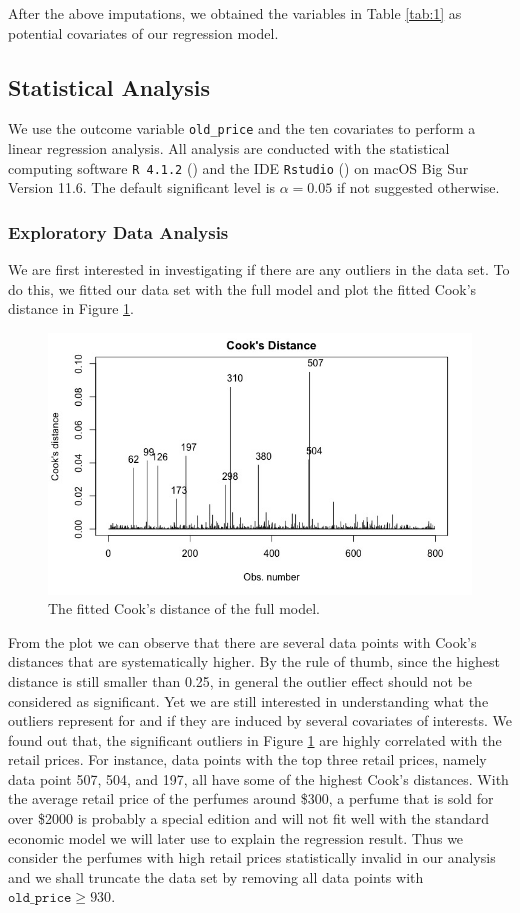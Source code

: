 \documentclass[12pt]{amsart}
\begin{document}
After the above imputations, we obtained the variables in Table \ref{tab:1} as potential covariates of our regression model.

\subsection{Statistical Analysis}

We use the outcome variable \texttt{old\_price} and the ten covariates to perform a linear regression analysis. All analysis are conducted with the statistical computing software \texttt{R 4.1.2} (\cite{R}) and the IDE \texttt{Rstudio} (\cite{rstudio}) on macOS Big Sur Version 11.6. The default significant level is $\alpha = 0.05$ if not suggested otherwise.

\subsubsection{Exploratory Data Analysis}

We are first interested in investigating if there are any outliers in the data set. To do this, we fitted our data set with the full model and plot the fitted Cook's distance in Figure \ref{fig1}. 
\begin{figure}[H]
    \centering
    \includegraphics[width = 0.8\linewidth]{423f1.jpg}
    \caption{The fitted Cook's distance of the full model.}
    \label{fig1}
\end{figure}
From the plot we can observe that there are several data points with Cook's distances that are systematically higher. By the rule of thumb, since the highest distance is still smaller than 0.25, in general the outlier effect should not be considered as significant. Yet we are still interested in understanding what the outliers represent for and if they are induced by several covariates of interests. We found out that, the significant outliers in Figure \ref{fig1} are highly correlated with the retail prices. For instance, data points with the top three retail prices, namely data point 507, 504, and 197, all have some of the highest Cook's distances. With the average retail price of the perfumes around \$300, a perfume that is sold for over \$2000 is probably a special edition and will not fit well with the standard economic model we will later use to explain the regression result. Thus we consider the perfumes with high retail prices statistically invalid in our analysis and we shall truncate the data set by removing all data points with $\texttt{old\_price} \geq 930$. 
\end{document}
